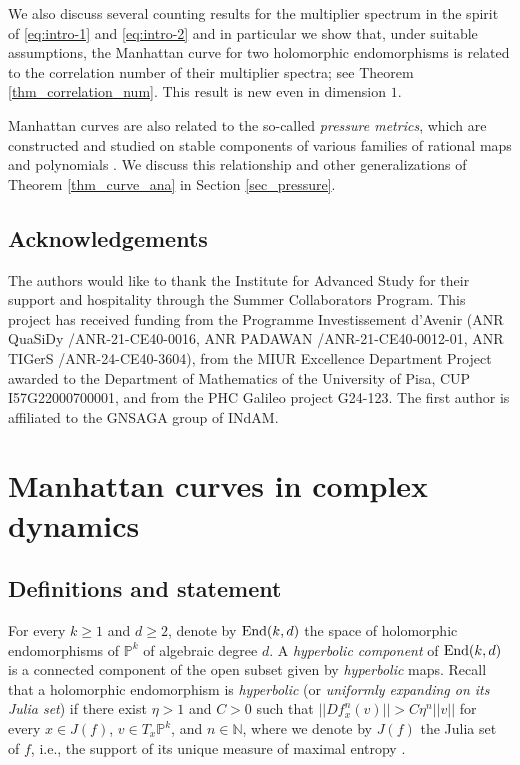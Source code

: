 \documentclass[11pt]{amsart}
\theoremstyle{plain}
\theoremstyle{definition}
\theoremstyle{remark}
\newcommand{\bbP}{\mathbb{P}}
\begin{document}
We also discuss several counting results for the multiplier spectrum in the spirit of \eqref{eq:intro-1} and \eqref{eq:intro-2}
and in particular we show that, under suitable assumptions, the Manhattan curve for two holomorphic endomorphisms is related to the correlation number of their multiplier spectra; see Theorem \ref{thm_correlation_num}. This result is new even in dimension $1$.

Manhattan curves are also
related to the so-called {\it pressure metrics}, which are constructed and studied on stable components of various families of rational maps and polynomials \cite{McMullen08,HeNie23}. We discuss this
relationship and other generalizations of Theorem \ref{thm_curve_ana} in Section \ref{sec_pressure}.


\subsection*{Acknowledgements}
The authors would like to thank the Institute for Advanced Study for their support and hospitality
through the Summer Collaborators Program.
This project has received funding from
 the
 Programme
 Investissement d'Avenir
(ANR QuaSiDy /ANR-21-CE40-0016,
ANR PADAWAN /ANR-21-CE40-0012-01,
ANR TIGerS /ANR-24-CE40-3604),
 from the MIUR Excellence Department Project awarded to the Department of Mathematics of the University of Pisa, CUP I57G22000700001,
 and
 from the PHC Galileo project G24-123.
The first
author is affiliated to the GNSAGA group of INdAM.


\section{Manhattan curves in complex dynamics}

\subsection{Definitions and statement}
For every 
$k\ge 1$ and $d\ge 2$, 
denote by ${\rm End}(k,d)$ the space of holomorphic endomorphisms of $\bbP^k$ of algebraic degree $d$. 
A {\it hyperbolic component} of ${\rm End}(k,d)$ is a connected component of the open subset given by \emph{hyperbolic} maps. Recall that a holomorphic endomorphism is {\it hyperbolic}
(or \emph{uniformly expanding on its Julia set})
if there exist $\eta > 1$ and $C>0$ such that
$||Df_x^n(v)|| > C\eta^n||v||$ for every $x \in J(f)$, $v \in T_x \mathbb P^k$, and $n\in\mathbb N$, where we denote by 
$J(f)$ the Julia set of $f$, i.e., the support of its
unique measure of maximal entropy \cite{FLM83,Lyubich82, Lyu83entropy,BD01,DS10}.
\end{document}
